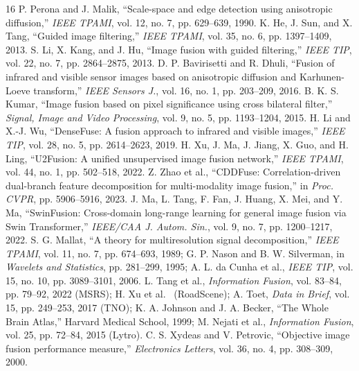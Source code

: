 \documentclass[conference]{IEEEtran}
\begin{document}
\begin{thebibliography}{16}
 P. Perona and J. Malik, ``Scale-space and edge detection using anisotropic diffusion,'' \textit{IEEE TPAMI}, vol. 12, no. 7, pp. 629--639, 1990.
 K. He, J. Sun, and X. Tang, ``Guided image filtering,'' \textit{IEEE TPAMI}, vol. 35, no. 6, pp. 1397--1409, 2013.
 S. Li, X. Kang, and J. Hu, ``Image fusion with guided filtering,'' \textit{IEEE TIP}, vol. 22, no. 7, pp. 2864--2875, 2013.
 D. P. Bavirisetti and R. Dhuli, ``Fusion of infrared and visible sensor images based on anisotropic diffusion and Karhunen-Loeve transform,'' \textit{IEEE Sensors J.}, vol. 16, no. 1, pp. 203--209, 2016.
 B. K. S. Kumar, ``Image fusion based on pixel significance using cross bilateral filter,'' \textit{Signal, Image and Video Processing}, vol. 9, no. 5, pp. 1193--1204, 2015.
 H. Li and X.-J. Wu, ``DenseFuse: A fusion approach to infrared and visible images,'' \textit{IEEE TIP}, vol. 28, no. 5, pp. 2614--2623, 2019.
 H. Xu, J. Ma, J. Jiang, X. Guo, and H. Ling, ``U2Fusion: A unified unsupervised image fusion network,'' \textit{IEEE TPAMI}, vol. 44, no. 1, pp. 502--518, 2022.
 Z. Zhao et al., ``CDDFuse: Correlation-driven dual-branch feature decomposition for multi-modality image fusion,'' in \textit{Proc. CVPR}, pp. 5906--5916, 2023.
 J. Ma, L. Tang, F. Fan, J. Huang, X. Mei, and Y. Ma, ``SwinFusion: Cross-domain long-range learning for general image fusion via Swin Transformer,'' \textit{IEEE/CAA J. Autom. Sin.}, vol. 9, no. 7, pp. 1200--1217, 2022.
 S. G. Mallat, ``A theory for multiresolution signal decomposition,'' \textit{IEEE TPAMI}, vol. 11, no. 7, pp. 674--693, 1989; G. P. Nason and B. W. Silverman, in \textit{Wavelets and Statistics}, pp. 281--299, 1995; A. L. da Cunha et al., \textit{IEEE TIP}, vol. 15, no. 10, pp. 3089--3101, 2006.
 L. Tang et al., \textit{Information Fusion}, vol. 83--84, pp. 79--92, 2022 (MSRS); H. Xu et al.~\cite{xu2022u2fusion} (RoadScene); A. Toet, \textit{Data in Brief}, vol. 15, pp. 249--253, 2017 (TNO); K. A. Johnson and J. A. Becker, ``The Whole Brain Atlas,'' Harvard Medical School, 1999; M. Nejati et al., \textit{Information Fusion}, vol. 25, pp. 72--84, 2015 (Lytro).
 C. S. Xydeas and V. Petrovic, ``Objective image fusion performance measure,'' \textit{Electronics Letters}, vol. 36, no. 4, pp. 308--309, 2000.

\end{thebibliography}
\end{document}
